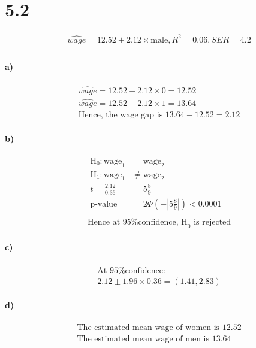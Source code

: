\documentclass[letterpaper,12pt,titlepage,oneside,final]{book}
\begin{document}





\section*{5.2}

\begin{align*}
&\hat{wage} = 12.52 + 2.12 \times \text{male}, R^2 = 0.06, SER= 4.2\\
\end{align*}
\paragraph{a)}
\begin{align*}
&\hat{wage} = 12.52 + 2.12 \times 0 = 12.52\\
&\hat{wage} = 12.52 + 2.12 \times 1 = 13.64\\
&\text{Hence, the wage gap is } 13.64-12.52 = 2.12
\end{align*}
\paragraph{b)}
\begin{align*}
\text{H}_0 : \text{wage}_1 &= \text{wage}_2 \\
\text{H}_1 : \text{wage}_1 &\neq \text{wage}_2\\
t = \frac{2.12}{0.36} &= 5\frac{8}{9}\\
\text{p-value} &= 2\Phi\left(-\left|5\frac{8}{9}\right|\right) < 0.0001\\
\end{align*}
\begin{align*}
&\text{Hence at 95\% confidence, H}_0 \text{ is rejected}
\end{align*}
\paragraph{c)}
\begin{align*}
&\text{At 95\% confidence:}\\
&2.12\pm 1.96 \times 0.36 = (1.41, 2.83)
\end{align*}
\paragraph{d)}
\begin{align*}
&\text{The estimated mean wage of women is 12.52}\\
&\text{The estimated mean wage of men is 13.64}
\end{align*}
\end{document}
